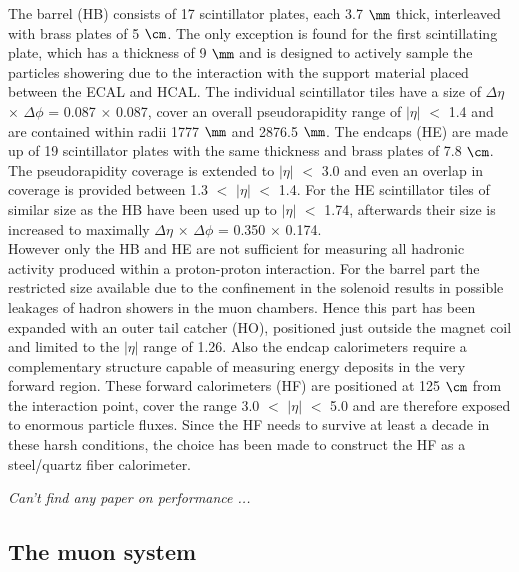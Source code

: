 The barrel (HB) consists of 17 scintillator plates, each 3.7 $\mm$ thick, interleaved with brass plates of 5 $\cm$. The only exception is found for the first scintillating plate, which has a thickness of 9 $\mm$ and is designed to actively sample the particles showering due to the interaction with the support material placed between the ECAL and HCAL. The individual scintillator tiles have a size of $\Delta \eta$ $\times$ $\Delta \phi$ = 0.087 $\times$ 0.087, cover an overall pseudorapidity range of $\vert \eta \vert$ $<$ 1.4 and are contained within radii 1777 $\mm$ and 2876.5 $\mm$. The endcaps (HE) are made up of 19 scintillator plates with the same thickness and brass plates of 7.8 $\cm$. The pseudorapidity coverage is extended to $\vert \eta \vert$ $<$ 3.0 and even an overlap in coverage is provided between 1.3 $<$ $\vert \eta \vert$ $<$ 1.4. For the HE scintillator tiles of similar size as the HB have been used up to $\vert \eta \vert$ $<$ 1.74, afterwards their size is increased to maximally $\Delta \eta$ $\times$ $\Delta \phi$ = 0.350 $\times$ 0.174.
\\
However only the HB and HE are not sufficient for measuring all hadronic activity produced within a proton-proton interaction. 
For the barrel part the restricted size available due to the confinement in the solenoid results in possible leakages of hadron showers in the muon chambers.
Hence this part has been expanded with an outer tail catcher (HO), positioned just outside the magnet coil and limited to the $\vert \eta \vert$ range of 1.26. Also the endcap calorimeters require a complementary structure capable of measuring energy deposits in the very forward region. These forward calorimeters (HF) are positioned at 125 $\cm$ from the interaction point, cover the range 3.0 $<$ $\vert \eta \vert$ $<$ 5.0 and are therefore exposed to enormous particle fluxes. Since the HF needs to survive at least a decade in these harsh conditions, the choice has been made to construct the HF as a steel/quartz fiber calorimeter.

\textit{Can't find any paper on performance ...}

\subsection{The muon system}\label{sec::MuonChamber}

